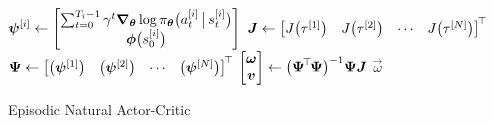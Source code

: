 			\begin{algorithm}  \DontPrintSemicolon
				\(\displaystyle \bm{\psi}^{[i]} \gets \begin{bmatrix} \sum_{t = 0}^{T_i - 1} \gamma^t \grad_{\bm{\theta}} \log \pi_{\bm{\theta}}\bigl( a_t^{[i]} \,\big\vert\, s_t^{[i]} \bigr) \\ \bm{\phi}\bigl(s_0^{[i]}\bigr) \end{bmatrix} \) \;
				\(\displaystyle \bm{J} \gets \begin{bmatrix} J\bigl( \tau^{[1]} \bigr) & J\bigl( \tau^{[2]} \bigr) & \cdots & J\bigl( \tau^{[N]} \bigr) \end{bmatrix}^{\!\top\!} \) \;
				\(\displaystyle \bm{\mathrm{\Psi}} \gets \begin{bmatrix} \bigl(\bm{\psi}^{[1]}\bigr) & \bigl(\bm{\psi}^{[2]}\bigr) & \cdots & \bigl(\bm{\psi}^{[N]}\bigr) \end{bmatrix}^{\!\top\!} \) \;
				\(\displaystyle \begin{bmatrix} \bm{\omega} \\ \bm{v} \end{bmatrix} \gets \bigl( \bm{\mathrm{\Psi}}^{\!\top\!} \bm{\mathrm{\Psi}} \bigr)^{-1} \bm{\mathrm{\Psi}} \bm{J} \) \;
				\Return \( \vec{\omega} \) \;
				\caption{Episodic Natural Actor-Critic}
				\label{alg:enac}
			\end{algorithm}

